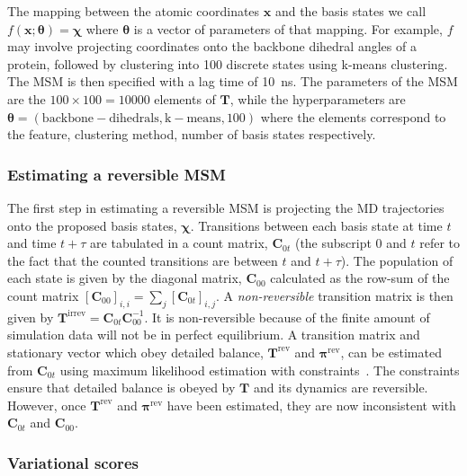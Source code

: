 \documentclass[journal=jacsat,manuscript=article]{achemso}
\begin{document}
The mapping between the atomic coordinates $\mathbf{x}$ and the basis states we call $f(\mathbf{x}; \bm{\theta}) =  \bm{\chi}$ where $\bm{\theta}$ is a vector of parameters of that mapping. For example, $f$ may involve projecting coordinates onto the backbone dihedral angles of a protein, followed by clustering into \num{100} discrete states using k-means clustering. The MSM is then specified with a lag time of \SI{10}{\nano\second}. The parameters of the MSM are the $100 \times 100 = 10000$ elements of $\mathbf{T}$, while the hyperparameters are $\bm{\theta}=(\mathrm{backbone-dihedrals}, \mathrm{k-means}, 100)$ where the elements correspond to the feature, clustering method, number of basis states respectively.  

\subsubsection{Estimating a reversible MSM}

The first step in estimating a reversible MSM is projecting the MD trajectories onto the proposed basis states, $\bm{\chi}$. Transitions between each basis state at time $t$ and time $t + \tau$ are tabulated in a count matrix, $\mathbf{C}_{0t}$ (the subscript $0$ and $t$ refer to the fact that the counted transitions are between $t$ and $t+\tau$). The population of each state is given by the diagonal matrix, $\mathbf{C}_{00}$ calculated as the row-sum of the count matrix $[\mathbf{C}_{00}]_{i, i} = \sum_j [\mathbf{C}_{0t}]_{i, j}$.  A \emph{non-reversible} transition matrix is then given by $\mathbf{T}^{\mathrm{irrev}} = \mathbf{C}_{0t}\mathbf{C}_{00}^{-1}$. It is non-reversible because of the finite amount of simulation data will not be in perfect equilibrium. A transition matrix and stationary vector which obey detailed balance, $\mathbf{T}^{\mathrm{rev}}$ and $\bm{\pi}^{\mathrm{rev}}$, can be estimated from $\mathbf{C}_{0t}$ using maximum likelihood estimation with constraints~\cite{trendelkamp-schroer_estimation_2015}. The constraints ensure that detailed balance is obeyed by $\mathbf{T}$ and its dynamics are reversible.  However, once $\mathbf{T}^{\mathrm{rev}}$ and $\bm{\pi}^{\mathrm{rev}}$ have been estimated, they are now inconsistent with $\mathbf{C}_{0t}$ and $\mathbf{C}_{00}$. 

\subsubsection{Variational scores}
\end{document}
